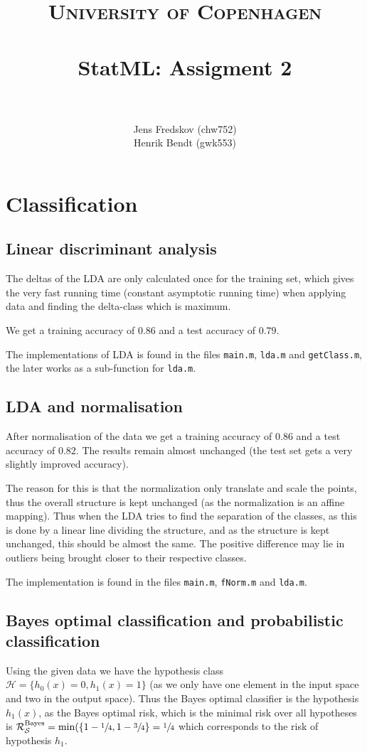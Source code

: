 \documentclass[a4paper, 11pt]{article}
\title{ 
\normalfont \normalsize 
\textsc{University of Copenhagen} \\ [25pt]
\horrule{0.5pt} \\[0.4cm]
\huge StatML: Assigment 2\\
\horrule{2pt} \\[0.5cm]
}
\author{Jens Fredskov (chw752)\\Henrik Bendt (gwk553)}
\begin{document}
\maketitle

\pagebreak
\section{Classification}
\subsection{Linear discriminant analysis}
The deltas of the LDA are only calculated once for the training set, which gives the very fast running time (constant asymptotic running time) when applying data and finding the delta-class which is maximum.

We get a training accuracy of $0.86$ and a test accuracy of $0.79$.

The implementations of LDA is found in the files \texttt{main.m}, \texttt{lda.m} and \texttt{getClass.m}, the later works as a sub-function for \texttt{lda.m}.

\subsection{LDA and normalisation}
After normalisation of the data we get a training accuracy of $0.86$ and a test accuracy of $0.82$. The results remain almost unchanged (the test set gets a very slightly improved accuracy).

The reason for this is that the normalization only translate and scale the points, thus the overall structure is kept unchanged (as the normalization is an affine mapping). Thus when the LDA tries to find the separation of the classes, as this is done by a linear line dividing the structure, and as the structure is kept unchanged, this should be almost the same. The positive difference may lie in outliers being brought closer to their respective classes.

The implementation is found in the files \texttt{main.m}, \texttt{fNorm.m} and \texttt{lda.m}.

\subsection{Bayes optimal classification and probabilistic classification}
Using the given data we have the hypothesis class $\mathcal{H} = \{ h_0(x) = 0, h_1(x) = 1 \}$ (as we only have one element in the input space and two in the output space). Thus the Bayes optimal classifier is the hypothesis $h_1(x)$, as the Bayes optimal risk, which is the minimal risk over all hypotheses is $\mathcal{R}^{\text{Bayes}}_{\mathcal{S}} = \min(\{ 1 - \sfrac{1}{4}, 1 - \sfrac{3}{4}\} = \sfrac{1}{4}$ which corresponds to the risk of hypothesis $h_1$.
\end{document}
